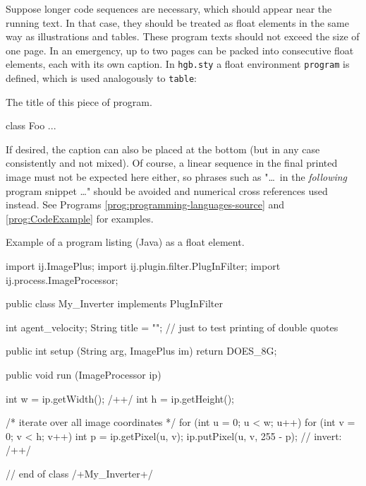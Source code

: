 Suppose longer code sequences are necessary, which should appear near the
running text. In that case, they should be treated as float elements in the same
way as illustrations and tables. These program texts should not exceed the size
of one page. In an emergency, up to two pages can be packed into consecutive
float elements, each with its own caption. In \texttt{hgb.sty} a float
environment \texttt{program} is defined, which is used analogously to
\texttt{table}:
%
\begin{LaTeXCode}[numbers=none]
\begin{program}
\caption{The title of this piece of program.}
\label{prog:xyz}
\begin{JavaCode}
  class Foo {
    ...
  }
\end{JavaCode}
\end{program}
\end{LaTeXCode}
%
If desired, the caption can also be placed at the bottom (but in any case
consistently and not mixed). Of course, a linear sequence in the final
printed image must not be expected here either, so phrases such as "\ldots\
in the \emph{following} program snippet \ldots" should be avoided and
numerical cross references used instead. See Programs
\ref{prog:programming-languages-source} and \ref{prog:CodeExample} for examples.


\begin{program}
\caption{Example of a program listing (Java) as a float element.}
\label{prog:CodeExample}
\begin{JavaCode}
import ij.ImagePlus;
import ij.plugin.filter.PlugInFilter;
import ij.process.ImageProcessor;

public class My_Inverter implements PlugInFilter {
    int agent_velocity;
    String title = ""; // just to test printing of double quotes

    public int setup (String arg, ImagePlus im) {
        return DOES_8G;
    }

    public void run (ImageProcessor ip) {
        int w = ip.getWidth(); /+\label{ExampleCodeLabel}+/
        int h = ip.getHeight();

        /* iterate over all image coordinates */
        for (int u = 0; u < w; u++) {
            for (int v = 0; v < h; v++) {
                int p = ip.getPixel(u, v);
                ip.putPixel(u, v, 255 - p); // invert: /+\label{MathInCode}+/
            }
        }
    }
} // end of class /+My\_Inverter+/
\end{JavaCode}
%
\end{program}

